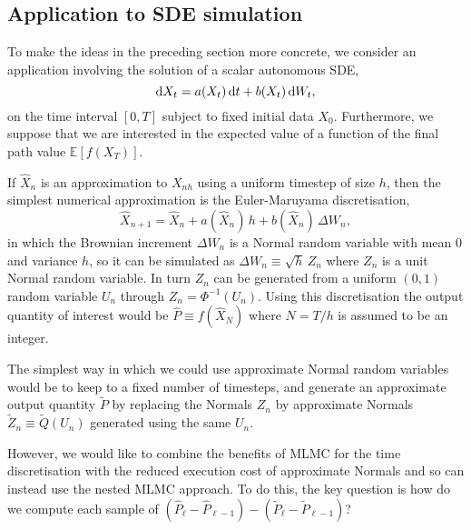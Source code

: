 \documentclass[11pt]{article}
\def \EE {{\mathbb{E}}}
\def \D {{\rm d}}
\def \tP {{\widetilde{P}}}
\def \tQ {{\widetilde{Q}}}
\def \tZ {{\widetilde{Z}}}
\def \hP {{\widehat{P}}}
\def \hX {{\widehat{X}}}
\def \hXn {{\widehat{X}_n}}
\def \hXnp {{\widehat{X}_{n+1}}}
\begin{document}
\subsection{Application to SDE simulation}

To make the ideas in the preceding section more concrete, we consider
an application involving the solution of a scalar autonomous SDE,
\[
\D X_t = a(X_t)\, \D t + b(X_t)\, \D W_t,
\]
on the time interval $[0,T]$ subject to fixed initial data $X_0$.
Furthermore, we suppose that we are interested in the expected
value of a function of the final path value $\EE[f(X_T)]$.

If $\hXn$ is an approximation to $X_{nh}$ using a uniform timestep of size $h$,
then the simplest numerical approximation is the Euler-Maruyama discretisation,
\[
\hXnp = \hXn + a(\hXn)\, h + b(\hXn)\, \Delta W_n,
\]
in which the Brownian increment $\Delta W_n$ is a Normal random
variable with mean 0 and variance $h$, so it can be simulated as
$
\Delta W_n \equiv \sqrt{h}\, Z_n
$
where $Z_n$ is a unit Normal random variable.  In turn $Z_n$ can 
be generated from a uniform $(0,1)$ random variable $U_n$ through 
$Z_n = \Phi^{-1}(U_n)$.
Using this discretisation the output quantity of interest would
be $\hP \equiv f(\hX_N)$ where $N = T/h$ is assumed to be an integer.

The simplest way in which we could use approximate Normal random
variables would be to keep to a fixed number of timesteps, and
generate an approximate output quantity $\tP$ by replacing the
Normals $Z_n$ by approximate Normals $\tZ_n \equiv \tQ(U_n)$
generated using the same $U_n$.

However, we would like to combine the benefits of MLMC for the time
discretisation with the reduced execution cost of approximate
Normals and so can instead use the nested MLMC approach.
To do this, the key question is how do we compute each sample of
$(\hP_\ell {-} \hP_{\ell-1}) - (\tP_\ell {-} \tP_{\ell-1})$?
\end{document}
